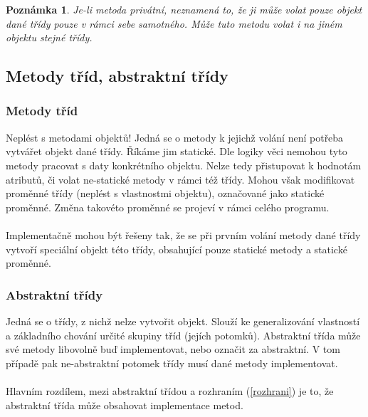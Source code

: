 \documentclass[10pt,a4paper]{article}
\newtheorem{note}{Poznámka}
\begin{document}
			\begin{note}
				Je-li metoda privátní, neznamená to, že ji může volat pouze objekt dané třídy pouze v rámci sebe samotného. Může tuto metodu volat i na jiném objektu stejné třídy.
			\end{note}

	\subsection{Metody tříd, abstraktní třídy}
		\subsubsection{Metody tříd}
			\label{metody-trid}
			Neplést s metodami objektů! Jedná se o metody k jejichž volání není potřeba vytvářet objekt dané třídy. Říkáme jim statické. Dle logiky věci nemohou tyto metody pracovat s daty konkrétního objektu. Nelze tedy přistupovat k hodnotám atributů, či volat ne-statické metody v rámci též třídy. Mohou však modifikovat proměnné třídy (neplést s vlastnostmi objektu), označované jako statické proměnné. Změna takovéto proměnné se projeví v rámci celého programu.
			\\
			\\
			Implementačně mohou být řešeny tak, že se při prvním volání metody dané třídy vytvoří speciální objekt této třídy, obsahující pouze statické metody a statické proměnné.

		\subsubsection{Abstraktní třídy}
			\label{abstraktni-tridy}
			Jedná se o třídy, z nichž nelze vytvořit objekt. Slouží ke generalizování vlastností a základního chování určité skupiny tříd (jejích potomků). Abstraktní třída může své metody libovolně buď implementovat, nebo označit za abstraktní. V tom případě pak ne-abstraktní potomek třídy musí dané metody implementovat.
			\\
			\\
			Hlavním rozdílem, mezi abstraktní třídou a rozhraním (\ref{rozhrani}) je to, že abstraktní třída může obsahovat implementace metod.
\end{document}
